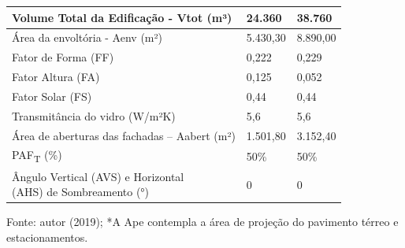 \begin{table}[H]
\begin{tabular*}{\columnwidth}{@{\extracolsep{\fill}}l|ll}
    Volume Total da Edificação - Vtot (m³)                                          & 24.360                     & 38.760                \\ \hline
    Área da envoltória - Aenv (m²)                                                  & 5.430,30                   & 8.890,00              \\ \hline
    Fator de Forma (FF)                                                             & 0,222                      & 0,229                 \\ \hline
    Fator Altura (FA)                                                               & 0,125                      & 0,052                 \\ \hline
    Fator Solar (FS)                                                                & 0,44                       & 0,44                  \\ \hline
    Transmitância do vidro (W/m²K)                                                  & 5,6                        & 5,6                   \\ \hline
    Área de aberturas das fachadas – Aabert (m²)                                    & 1.501,80                   & 3.152,40              \\ \hline
    PAF\textsubscript{T} (\%)                                                       & 50\%                       & 50\%                  \\ \hline
    \makecell[l]{Ângulo Vertical (AVS) e Horizontal\\ (AHS) de Sombreamento (°)}    & 0                          & 0                     \\ \hline
    \end{tabular*}
    \begin{flushleft}
        \par \small Fonte: autor (2019); *A Ape contempla a área de projeção do pavimento térreo e estacionamentos.
    \end{flushleft}
\end{table}

